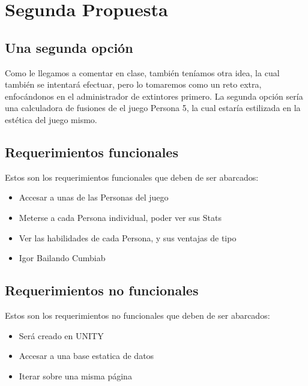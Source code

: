 \documentclass[a4paper,twoside,10pt]{report}
\begin{document}
\newpage 

\chapter{Segunda Propuesta}

\section{Una segunda opción}

\par Como le llegamos a comentar en clase, también teníamos otra idea, la cual también se intentará efectuar, pero lo tomaremos como un reto extra, enfocándonos en el administrador de extintores primero. La segunda opción sería una calculadora de fusiones de el juego Persona 5, la cual estaría estilizada en la estética del juego mismo.

\section{Requerimientos funcionales}

\par Estos son los requerimientos funcionales que deben de ser abarcados:

\begin{itemize}
	\item Accesar a unas de las Personas del juego
	\item Meterse a cada Persona individual, poder ver sus Stats
	\item Ver las habilidades de cada Persona, y sus ventajas de tipo
    \item Igor Bailando Cumbiab
\end{itemize}

\section{Requerimientos no funcionales}

\par Estos son los requerimientos no funcionales que deben de ser abarcados:

\begin{itemize}
	\item Será creado en UNITY
	\item Accesar a una base estatica de datos
	\item Iterar sobre una misma página
\end{itemize}
\end{document}
